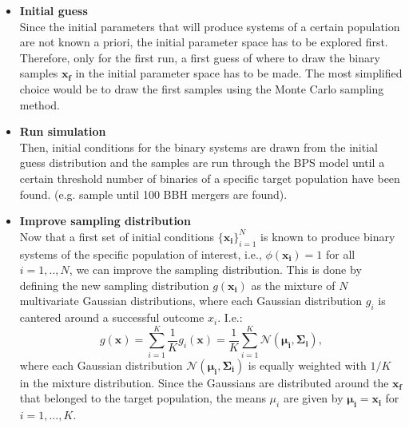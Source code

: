 \documentclass[a4paper,fleqn,usenatbib]{mnras}
\begin{document}
\begin{itemize}
\item \textbf{Initial guess} \\
Since the initial parameters that will produce systems of a certain population are not known a priori, the initial parameter space has to be explored first. Therefore,  only for the first run, a first guess of where to draw the binary samples $\mathbf{x_f}$ in the initial parameter space has to be made. The most simplified choice would be to draw the first samples using the Monte Carlo sampling method.  



  

\item \textbf{Run simulation } \\ Then, initial  conditions for the binary systems are drawn from the initial guess distribution and the samples are run through the BPS model until a certain threshold number of binaries of a specific target population have been found. (e.g.  sample until 100 BBH mergers are found). 

\item \textbf{Improve sampling distribution} \\
Now that a first set of initial conditions $\{ \mathbf{x_i} \}_{i=1}^{N}$ is known to produce binary systems of the specific population of interest, i.e., $\phi(\mathbf{x_i}) = 1$ for all $i = 1, .., N$, we can improve the sampling distribution. 
This is done by defining the new sampling distribution $g(\mathbf{x_i})$ as the mixture of $N$ multivariate Gaussian distributions, where each Gaussian distribution $g_i$ is cantered around a successful outcome $x_i$. I.e.: 
%
\begin{equation}
    g(\mathbf{x}) = \sum _{i=1}^{K} \frac{1}{K} g_i(\mathbf{x}) = \frac{1}{K}  \sum _{i=1}^{K}  \mathcal{N}({\boldsymbol {\mu _{i},\Sigma _{i}}}), 
	\label{eq:instrumental-distribution}
\end{equation}
%
where each Gaussian distribution $\mathcal{N}({\boldsymbol {\mu _{i},\Sigma _{i}}})$ is equally weighted with $1/K$ in the mixture distribution. Since the Gaussians are distributed around the $\mathbf{x_f}$ that belonged to the target population, the means $\mu_i$ are given by $\mathbf{\mu_i} = \mathbf{x_i}$ for $i = 1, ..., K$. 


\end{itemize}
\end{document}
